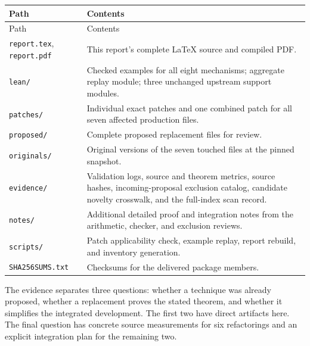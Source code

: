 \documentclass[11pt,letterpaper]{article}
\newcommand{\code}[1]{\nolinkurl{#1}}
\begin{document}
\begin{longtable}{@{}P{0.31\textwidth}P{0.62\textwidth}@{}}
\toprule
Path & Contents\\\midrule
\endfirsthead
\toprule Path & Contents\\\midrule
\endhead
\code{report.tex}, \code{report.pdf} & This report's complete LaTeX source and compiled PDF.\\
\code{lean/} & Checked examples for all eight mechanisms; aggregate replay module; three unchanged upstream support modules.\\
\code{patches/} & Individual exact patches and one combined patch for all seven affected production files.\\
\code{proposed/} & Complete proposed replacement files for review.\\
\code{originals/} & Original versions of the seven touched files at the pinned snapshot.\\
\code{evidence/} & Validation logs, source and theorem metrics, source hashes, incoming-proposal exclusion catalog, candidate novelty crosswalk, and the full-index scan record.\\
\code{notes/} & Additional detailed proof and integration notes from the arithmetic, checker, and exclusion reviews.\\
\code{scripts/} & Patch applicability check, example replay, report rebuild, and inventory generation.\\
\code{SHA256SUMS.txt} & Checksums for the delivered package members.\\
\bottomrule
\end{longtable}

The evidence separates three questions: whether a technique was already proposed, whether a replacement proves the stated theorem, and whether it simplifies the integrated development. The first two have direct artifacts here. The final question has concrete source measurements for six refactorings and an explicit integration plan for the remaining two.
\end{document}
